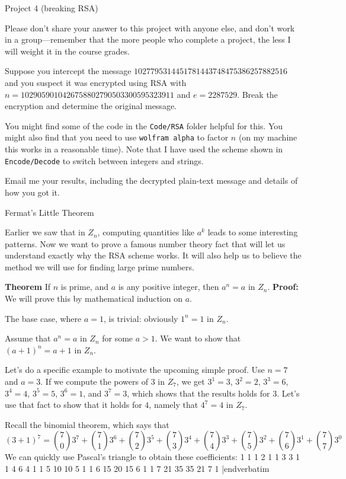 {\bigboldfont Project 4} (breaking RSA)
\medskip

Please don't share your answer to this project with anyone else, and don't work in
a group---remember that the
more people who complete a project, the less I will weight it in the course grades.
\medskip

Suppose you intercept the message  
$1027795314451781443748475386257882516$ 
and you suspect it was encrypted using RSA
with 
$n=1029059010426758802790503300595323911$ and $e=2287529$.
Break the encryption and determine the original message.
\medskip

You might find some of the code in the {\tt Code/RSA} folder helpful for this.
You might also find that you need to use {\tt wolfram alpha} to factor $n$ (on my
machine this works in a reasonable time).
Note that I have used the scheme shown in {\tt Encode/Decode} to switch between
integers and strings.
\medskip

Email me your results, including the decrypted plain-text message and details of how you got it.
\border

\vfil\eject

{\bigboldfont Fermat's Little Theorem}
\medskip

Earlier we saw that in $Z_n$, computing quantities like $a^k$ leads to some interesting
patterns.  Now we want to prove a famous number theory fact that will let us understand
exactly why the RSA scheme works.  It will also help us to believe the method we will
use for finding large prime numbers.
\medskip

{\bf Theorem}  If $n$ is prime, and $a$ is any positive integer,
then $a^n = a$ in $Z_n$.
\medskip
{}
{\bf Proof:} 
We will prove this by mathematical induction on $a$.
\medskip

The base case, where $a=1$, is trivial:  obviously $1^n = 1$ in $Z_n$.
\medskip

Assume that $a^n = a$ in $Z_n$ for some $a>1$.
We want to show that $(a+1)^n = a+1$ in $Z_n$.
\medskip

Let's do a specific example to motivate the upcoming simple proof.
Use $n=7$ and $a=3$.
If we compute the powers of $3$ in $Z_7$, we get
$3^1=3$, $3^2=2$, $3^3=6$, $3^4=4$, $3^5=5$, $3^6=1$, and $3^7=3$, which shows
that the results holds for $3$.  Let's use that fact to show that it holds for $4$, namely 
that $4^7 = 4$ in $Z_7$.
\medskip

Recall the binomial theorem, which says that 
$$
\scriptstyle
(3+1)^7 = {7 \choose 0} 3^7 + {7 \choose 1} 3^6 + {7 \choose 2} 3^5 + 
{7 \choose 3} 3^4 +
{7 \choose 4} 3^3 +
{7 \choose 5} 3^2 +
{7 \choose 6} 3^1 +
{7 \choose 7} 3^0
$$
We can quickly use Pascal's triangle to obtain these coefficients:
               1   1
             1   2   1
           1   3   3   1
         1   4   6   4   1
       1   5  10  10   5   1
     1   6  15  20  15   6   1
   1   7  21  35  35  21   7   1
|endverbatim
\medskip

